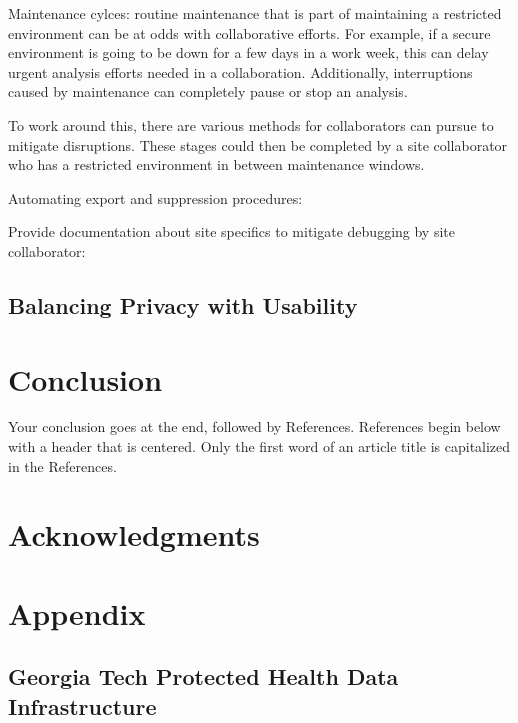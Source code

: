 \documentclass{amia}
\begin{document}
Maintenance cylces: routine maintenance that is part of maintaining a restricted environment can be at odds with collaborative efforts. For example, if a secure environment is going to be down for a few days in a work week, this can delay urgent analysis efforts needed in a collaboration. Additionally, interruptions caused by maintenance can completely pause or stop an analysis. 

To work around this, there are various methods for collaborators can pursue to mitigate disruptions. These stages could then be completed by a site collaborator who has a restricted environment in between maintenance windows. 

Automating export and suppression procedures:

Provide documentation about site specifics to mitigate debugging by site collaborator:



\subsection{Balancing Privacy with Usability}

\section*{Conclusion}

Your conclusion goes at the end, followed by References.  References begin below with a header that is centered.  Only the first word of an article title is capitalized in the References.

\section*{Acknowledgments}

\makeatletter
\renewcommand{\@biblabel}[1]{\hfill #1.}
\makeatother


  

\section*{Appendix}

\subsection{Georgia Tech Protected Health Data Infrastructure}
\end{document}
